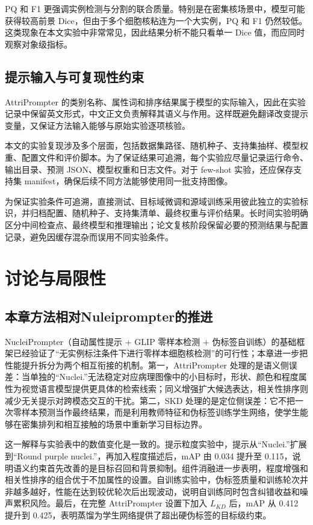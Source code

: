 PQ 和 F1 更强调实例检测与分割的联合质量。特别是在密集核场景中，模型可能获得较高前景 Dice，但由于多个细胞核粘连为一个大实例，PQ 和 F1 仍然较低。这类现象在本文实验中非常常见，因此结果分析不能只看单一 Dice 值，而应同时观察对象级指标。

\subsection{提示输入与可复现性约束}
AttriPrompter 的类别名称、属性词和排序结果属于模型的实际输入，因此在实验记录中保留英文形式，中文正文负责解释其语义与作用。这样既避免翻译改变提示变量，又保证方法输入能够与原始实验逐项核验。

本文的实验复现涉及多个层面，包括数据集路径、随机种子、支持集抽样、模型权重、配置文件和评价脚本。为了保证结果可追溯，每个实验应尽量记录运行命令、输出目录、预测 JSON、模型权重和日志文件。对于 few-shot 实验，还应保存支持集 manifest，确保后续不同方法能够使用同一批支持图像。

为保证实验条件可追溯，直接测试、目标域微调和源域训练采用彼此独立的实验标识，并归档配置、随机种子、支持集清单、最终权重与评价结果。长时间实验明确区分中间检查点、最终模型和推理输出；论文复核阶段保留必要的预测结果与配置记录，避免因缓存混杂而误用不同实验条件。

\section{讨论与局限性}

\subsection{本章方法相对Nuleiprompter的推进}

NucleiPrompter（自动属性提示 + GLIP 零样本检测 + 伪标签自训练）的基础框架已经验证了“无实例标注条件下进行零样本细胞核检测”的可行性；本章进一步把性能提升拆分为两个相互衔接的机制。第一，AttriPrompter 处理的是语义侧误差：当单独的“Nuclei.”无法稳定对应病理图像中的小目标时，形状、颜色和程度属性为视觉语言模型提供更具体的检索线索；同义增强扩大候选表达，相关性排序则减少无关提示对跨模态交互的干扰。第二，SKD 处理的是定位侧误差：它不把一次零样本预测当作最终结果，而是利用教师特征和伪标签训练学生网络，使学生能够在密集排列和相互接触的场景中重新学习目标边界。

这一解释与实验表中的数值变化是一致的。提示粒度实验中，提示从“Nuclei.”扩展到“Round purple nuclei.”，再加入程度描述后，mAP 由 0.034 提升至 0.115，说明语义约束首先改善的是目标召回和背景抑制。组件消融进一步表明，程度增强和相关性排序的组合优于不加属性的设置。自训练实验中，伪标签质量和训练轮次并非越多越好，性能在达到较优轮次后出现波动，说明自训练同时包含纠错收益和噪声累积风险。最后，在完整 AttriPrompter 设置下加入 $L_{KD}$ 后，mAP 从 0.412 提升到 0.425，表明蒸馏为学生网络提供了超出硬伪标签的目标级约束。

